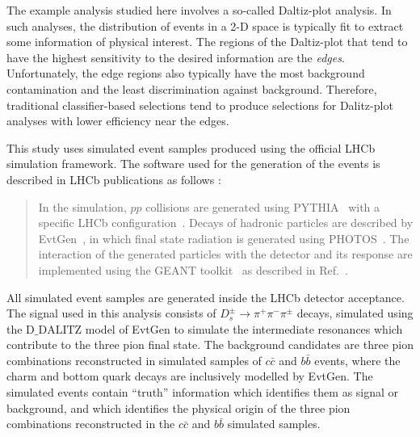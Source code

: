 

The example analysis studied here involves a so-called Daltiz-plot analysis.  In such analyses, the distribution of events in a 2-D space is typically fit to extract some information of physical interest.  The regions of the Daltiz-plot that tend to have the highest sensitivity to the desired information are the {\em edges}.  Unfortunately, the edge regions also typically have the most background contamination and the least discrimination against background.  Therefore, traditional classifier-based selections tend to produce selections for Dalitz-plot analyses with lower efficiency near the edges.   

This study uses simulated event samples produced using the official LHCb simulation framework.
The software used for the generation of the events is described in LHCb publications as follows :

\begin{quote}
In the simulation, $pp$ collisions are generated using
PYTHIA~\cite{Sjostrand:2006za} 
with a specific LHCb configuration~\cite{LHCb-PROC-2010-056}.  Decays of hadronic particles
are described by EvtGen~\cite{Lange:2001uf}, in which final state
radiation is generated using PHOTOS~\cite{Golonka:2005pn}. The
interaction of the generated particles with the detector and its
response are implemented using the GEANT
toolkit~\cite{Allison:2006ve, Agostinelli:2002hh} as described in
Ref.~\cite{LHCb-PROC-2011-006}.
\end{quote}

All simulated event samples are generated inside the LHCb detector acceptance.
The signal used in this analysis consists of $D_s^\pm\to\pi^+\pi^-\pi^\pm$ decays, simulated
using the $\textrm{D}\_\textrm{DALITZ}$ model of EvtGen to simulate the intermediate resonances which contribute to the
three pion final state. The background candidates are three pion combinations reconstructed in
simulated samples of $c\bar{c}$ and $b\bar{b}$ events, where the charm and bottom quark decays are
inclusively modelled by EvtGen. The simulated events contain ``truth'' information which identifies them as
signal or background, and which identifies the physical origin of the three pion combinations reconstructed
in the $c\bar{c}$ and $b\bar{b}$ simulated samples.

